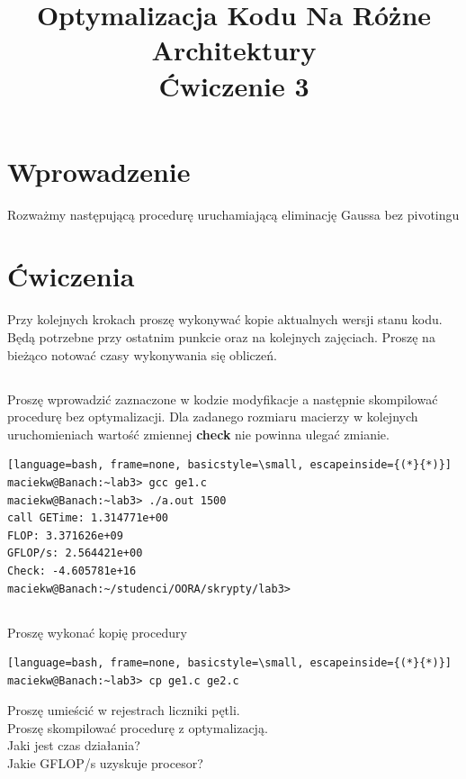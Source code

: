 \documentclass[12pt,a4paper]{article}
\begin{document}
\title{Optymalizacja Kodu Na Różne Architektury\\Ćwiczenie 3}
\date{}

\maketitle


\section{Wprowadzenie}
Rozważmy następującą procedurę uruchamiającą eliminację Gaussa bez pivotingu



\section{Ćwiczenia}

Przy kolejnych krokach proszę wykonywać kopie aktualnych wersji stanu kodu.
Będą potrzebne przy ostatnim punkcie oraz na kolejnych zajęciach.
Proszę na bieżąco notować czasy wykonywania się obliczeń.

\subsection{}


Proszę wprowadzić zaznaczone w kodzie modyfikacje a następnie skompilować procedurę bez optymalizacji.
Dla zadanego rozmiaru macierzy w kolejnych uruchomieniach wartość zmiennej \textbf{check} nie powinna ulegać zmianie.
\begin{lstlisting}[language=bash, frame=none, basicstyle=\small, escapeinside={(*}{*)}]
maciekw@Banach:~lab3> gcc ge1.c 
maciekw@Banach:~lab3> ./a.out 1500
call GETime: 1.314771e+00
FLOP: 3.371626e+09
GFLOP/s: 2.564421e+00
Check: -4.605781e+16
maciekw@Banach:~/studenci/OORA/skrypty/lab3>  
\end{lstlisting}

\subsection{}

Proszę wykonać kopię procedury
\begin{lstlisting}[language=bash, frame=none, basicstyle=\small, escapeinside={(*}{*)}]
maciekw@Banach:~lab3> cp ge1.c ge2.c
\end{lstlisting}
Proszę umieścić w rejestrach liczniki pętli.\\
Proszę skompilować procedurę z optymalizacją.\\
Jaki jest czas działania?\\
Jakie GFLOP/s uzyskuje procesor?
\end{document}

